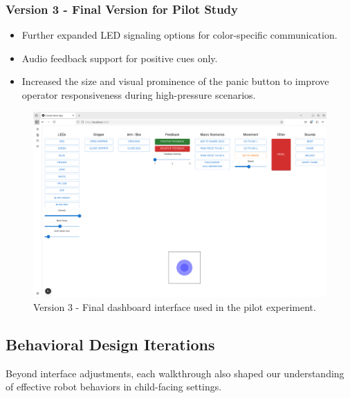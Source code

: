 \documentclass[a4paper]{usiinfbachelorproject}
\begin{document}
\subsubsection*{\textbf{Version 3 - Final Version for Pilot Study}}
\begin{itemize}
    \item Further expanded LED signaling options for color-specific communication.
    \item Audio feedback support for positive cues only.
    \item Increased the size and visual prominence of the panic button to improve operator responsiveness during high-pressure scenarios.
\end{itemize}
\begin{figure}[H]
    \centering
    \includegraphics[width=0.8\linewidth]{figures/dashboard_v3.png}
    \caption{Version 3 - Final dashboard interface used in the pilot experiment.}
    \label{fig:dashboard-v3}
\end{figure}

\subsection{\textbf{Behavioral Design Iterations}}

Beyond interface adjustments, each walkthrough also shaped our understanding of effective robot behaviors in child-facing settings.
\end{document}
